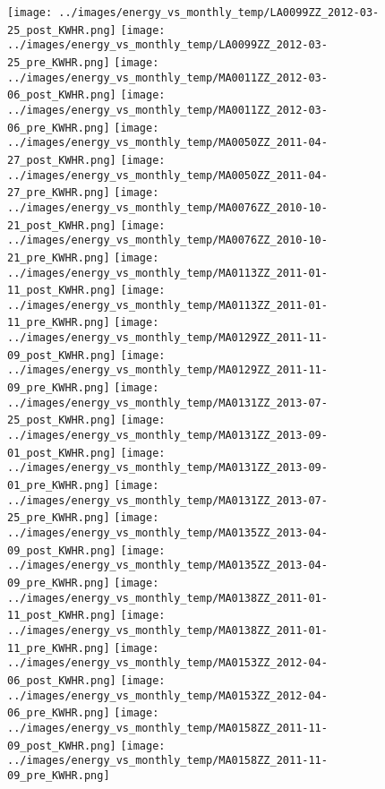 \clearpage
\begin{figure}
\centering
\texttt{[image: ../images/energy\_vs\_monthly\_temp/LA0099ZZ\_2012-03-25\_post\_KWHR.png]}
\texttt{[image: ../images/energy\_vs\_monthly\_temp/LA0099ZZ\_2012-03-25\_pre\_KWHR.png]}
\texttt{[image: ../images/energy\_vs\_monthly\_temp/MA0011ZZ\_2012-03-06\_post\_KWHR.png]}
\texttt{[image: ../images/energy\_vs\_monthly\_temp/MA0011ZZ\_2012-03-06\_pre\_KWHR.png]}
\texttt{[image: ../images/energy\_vs\_monthly\_temp/MA0050ZZ\_2011-04-27\_post\_KWHR.png]}
\texttt{[image: ../images/energy\_vs\_monthly\_temp/MA0050ZZ\_2011-04-27\_pre\_KWHR.png]}
\texttt{[image: ../images/energy\_vs\_monthly\_temp/MA0076ZZ\_2010-10-21\_post\_KWHR.png]}
\texttt{[image: ../images/energy\_vs\_monthly\_temp/MA0076ZZ\_2010-10-21\_pre\_KWHR.png]}
\texttt{[image: ../images/energy\_vs\_monthly\_temp/MA0113ZZ\_2011-01-11\_post\_KWHR.png]}
\texttt{[image: ../images/energy\_vs\_monthly\_temp/MA0113ZZ\_2011-01-11\_pre\_KWHR.png]}
\texttt{[image: ../images/energy\_vs\_monthly\_temp/MA0129ZZ\_2011-11-09\_post\_KWHR.png]}
\texttt{[image: ../images/energy\_vs\_monthly\_temp/MA0129ZZ\_2011-11-09\_pre\_KWHR.png]}
\texttt{[image: ../images/energy\_vs\_monthly\_temp/MA0131ZZ\_2013-07-25\_post\_KWHR.png]}
\texttt{[image: ../images/energy\_vs\_monthly\_temp/MA0131ZZ\_2013-09-01\_post\_KWHR.png]}
\texttt{[image: ../images/energy\_vs\_monthly\_temp/MA0131ZZ\_2013-09-01\_pre\_KWHR.png]}
\texttt{[image: ../images/energy\_vs\_monthly\_temp/MA0131ZZ\_2013-07-25\_pre\_KWHR.png]}
\texttt{[image: ../images/energy\_vs\_monthly\_temp/MA0135ZZ\_2013-04-09\_post\_KWHR.png]}
\texttt{[image: ../images/energy\_vs\_monthly\_temp/MA0135ZZ\_2013-04-09\_pre\_KWHR.png]}
\texttt{[image: ../images/energy\_vs\_monthly\_temp/MA0138ZZ\_2011-01-11\_post\_KWHR.png]}
\texttt{[image: ../images/energy\_vs\_monthly\_temp/MA0138ZZ\_2011-01-11\_pre\_KWHR.png]}
\texttt{[image: ../images/energy\_vs\_monthly\_temp/MA0153ZZ\_2012-04-06\_post\_KWHR.png]}
\texttt{[image: ../images/energy\_vs\_monthly\_temp/MA0153ZZ\_2012-04-06\_pre\_KWHR.png]}
\texttt{[image: ../images/energy\_vs\_monthly\_temp/MA0158ZZ\_2011-11-09\_post\_KWHR.png]}
\texttt{[image: ../images/energy\_vs\_monthly\_temp/MA0158ZZ\_2011-11-09\_pre\_KWHR.png]}
\end{figure}
